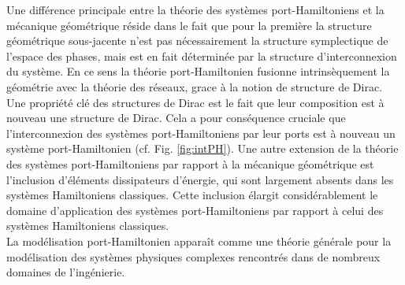 \documentclass[12pt, french]{article}
\begin{document}
	
	Une différence principale entre la théorie des systèmes port-Hamiltoniens et la mécanique géométrique réside dans le fait que pour la première la structure géométrique sous-jacente n'est pas nécessairement la structure symplectique de l'espace des phases, mais est en fait déterminée par la structure d'interconnexion du système.  En ce sens la théorie port-Hamiltonien fusionne intrinsèquement la géométrie avec la théorie des réseaux, grace \`a la notion de structure de Dirac. Une propriété clé des structures de Dirac est le fait que leur composition est à nouveau une structure de Dirac. Cela a pour conséquence cruciale que l'interconnexion des systèmes port-Hamiltoniens par leur ports est à nouveau un système port-Hamiltonien (cf. Fig. \ref{fig:intPH}). Une autre extension de la théorie des systèmes port-Hamiltoniens par rapport à la mécanique géométrique est l'inclusion d'éléments dissipateurs d'énergie, qui sont largement absents dans les systèmes Hamiltoniens classiques. Cette inclusion élargit considérablement le domaine d'application des systèmes port-Hamiltoniens par rapport à celui des systèmes Hamiltoniens classiques. \\
	
	La modélisation port-Hamiltonien apparaît comme une théorie générale pour la modélisation des systèmes physiques complexes rencontrés dans de nombreux domaines de l'ingénierie.
	
\end{document}
